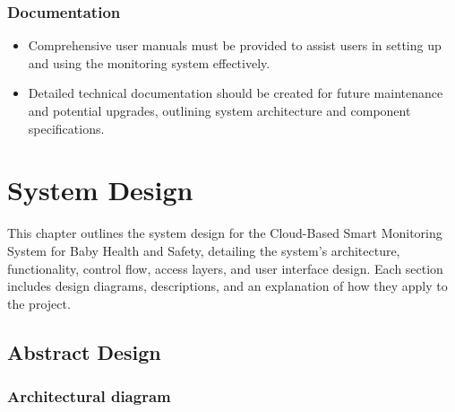 \documentclass[12pt,a4paper]{report}
\begin{document}
\subsection{Documentation}
\begin{itemize}
  \item Comprehensive user manuals must be provided to assist users in setting up and using the monitoring system effectively.
  \item Detailed technical documentation should be created for future maintenance and potential upgrades, outlining system architecture and component specifications.
\end{itemize}


\chapter{System Design}
This chapter outlines the system design for the Cloud-Based Smart Monitoring System for Baby Health and Safety, detailing the system's architecture, functionality, control flow, access layers, and user interface design. Each section includes design diagrams, descriptions, and an explanation of how they apply to the project.
\section{Abstract Design}

\subsection{Architectural diagram}
\end{document}
